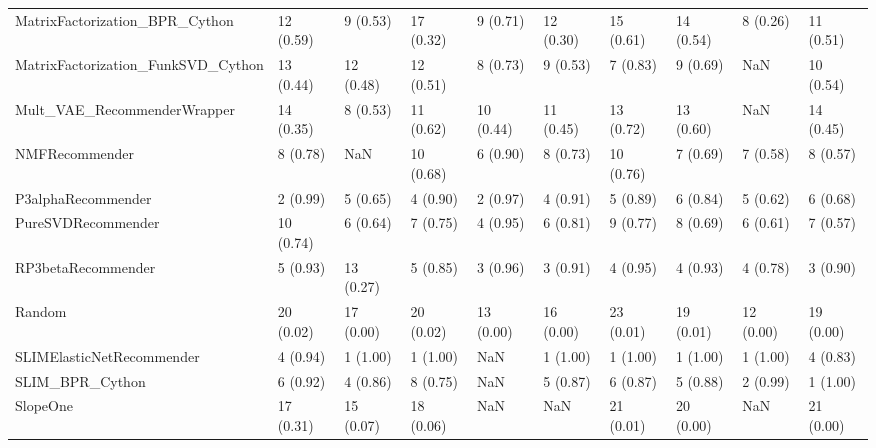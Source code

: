 \begin{tabular}{llllllllll}
     MatrixFactorization\_BPR\_Cython &                12 (0.59) &    9 (0.53) &     17 (0.32) &     9 (0.71) &            12 (0.30) &           15 (0.61) &         14 (0.54) &           8 (0.26) &         11 (0.51) \\
 MatrixFactorization\_FunkSVD\_Cython &                13 (0.44) &   12 (0.48) &     12 (0.51) &     8 (0.73) &             9 (0.53) &            7 (0.83) &          9 (0.69) &                NaN &         10 (0.54) \\
        Mult\_VAE\_RecommenderWrapper &                14 (0.35) &    8 (0.53) &     11 (0.62) &    10 (0.44) &            11 (0.45) &           13 (0.72) &         13 (0.60) &                NaN &         14 (0.45) \\
                     NMFRecommender &                 8 (0.78) &         NaN &     10 (0.68) &     6 (0.90) &             8 (0.73) &           10 (0.76) &          7 (0.69) &           7 (0.58) &          8 (0.57) \\
                 P3alphaRecommender &                 2 (0.99) &    5 (0.65) &      4 (0.90) &     2 (0.97) &             4 (0.91) &            5 (0.89) &          6 (0.84) &           5 (0.62) &          6 (0.68) \\
                 PureSVDRecommender &                10 (0.74) &    6 (0.64) &      7 (0.75) &     4 (0.95) &             6 (0.81) &            9 (0.77) &          8 (0.69) &           6 (0.61) &          7 (0.57) \\
                 RP3betaRecommender &                 5 (0.93) &   13 (0.27) &      5 (0.85) &     3 (0.96) &             3 (0.91) &            4 (0.95) &          4 (0.93) &           4 (0.78) &          3 (0.90) \\
                             Random &                20 (0.02) &   17 (0.00) &     20 (0.02) &    13 (0.00) &            16 (0.00) &           23 (0.01) &         19 (0.01) &          12 (0.00) &         19 (0.00) \\
          SLIMElasticNetRecommender &                 4 (0.94) &    1 (1.00) &      1 (1.00) &          NaN &             1 (1.00) &            1 (1.00) &          1 (1.00) &           1 (1.00) &          4 (0.83) \\
                    SLIM\_BPR\_Cython &                 6 (0.92) &    4 (0.86) &      8 (0.75) &          NaN &             5 (0.87) &            6 (0.87) &          5 (0.88) &           2 (0.99) &          1 (1.00) \\
                           SlopeOne &                17 (0.31) &   15 (0.07) &     18 (0.06) &          NaN &                  NaN &           21 (0.01) &         20 (0.00) &                NaN &         21 (0.00) \\

\end{tabular}
